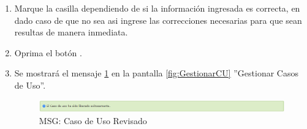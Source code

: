 \begin{enumerate}
				\item Marque la casilla dependiendo de si la información ingresada es correcta, en dado caso de que no sea asi ingrese las correcciones necesarias para que sean resultas de manera inmediata.
				
				\item Oprima el botón \IUAceptar.
				
				\item Se mostrará el mensaje \ref{fig:CURevisado} en la pantalla \ref{fig:GestionarCU} ''Gestionar Casos de Uso''.
				
				\begin{figure}[htbp!]
					\begin{center}
						\includegraphics[scale=0.6]{roles/lider/casosUso/pantallas/IU12-6MSG1}
						\caption{MSG: Caso de Uso Revisado}
						\label{fig:CURevisado}
					\end{center}
				\end{figure}
			
			\end{enumerate}